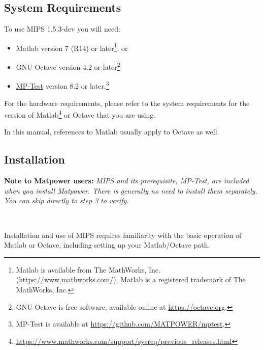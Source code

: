 \documentclass[12pt]{article}
\newcommand{\matlab}[0]{{\sc Matlab}}
\newcommand{\matpower}[0]{{\sc Matpower}}
\newcommand{\mptest}[0]{{MP-Test}}
\newcommand{\mptesturl}[0]{https://github.com/MATPOWER/mptest}
\newcommand{\mptestlink}[0]{\href{\mptesturl}{\mptest{}}}
\newcommand{\mips}[0]{{MIPS}}
\newcommand{\mipsver}[0]{1.5.3-dev}
\numberwithin{equation}{section}
\numberwithin{table}{section}
\numberwithin{figure}{section}
\begin{document}
\subsection{System Requirements}
\label{sec:sysreq}
To use \mips{} \mipsver{} you will need:
\begin{itemize}
\item \matlab{}\textsuperscript{\tiny \textregistered} version 7 (R14) or later\footnote{\matlab{} is available from The MathWorks, Inc. (\url{https://www.mathworks.com/}). \matlab{} is a registered trademark of The MathWorks, Inc.}, or
\item GNU Octave version 4.2 or later\footnote{GNU Octave \cite{octave} is free software, available online at \url{https://octave.org}.}
\item \mptestlink{} version 8.2 or later.\footnote{\mptest{} is available at \url{\mptesturl}.}
\end{itemize}

For the hardware requirements, please refer to the system requirements for the version of \matlab{}\footnote{\url{https://www.mathworks.com/support/sysreq/previous_releases.html}} or Octave that you are using.

In this manual, references to \matlab{} usually apply to Octave as well.

\subsection{Installation}
\label{sec:installation}

{\bf Note to \matpower{} users:} \emph{\mips{} and its prerequisite, \mptest{}, are included when you install \matpower{}. There is generally no need to install them separately. You can skip directly to step 3 to verify.}

~

Installation and use of \mips{} requires familiarity with the basic operation of \matlab{} or Octave, including setting up your \matlab{}/Octave path.
\end{document}
